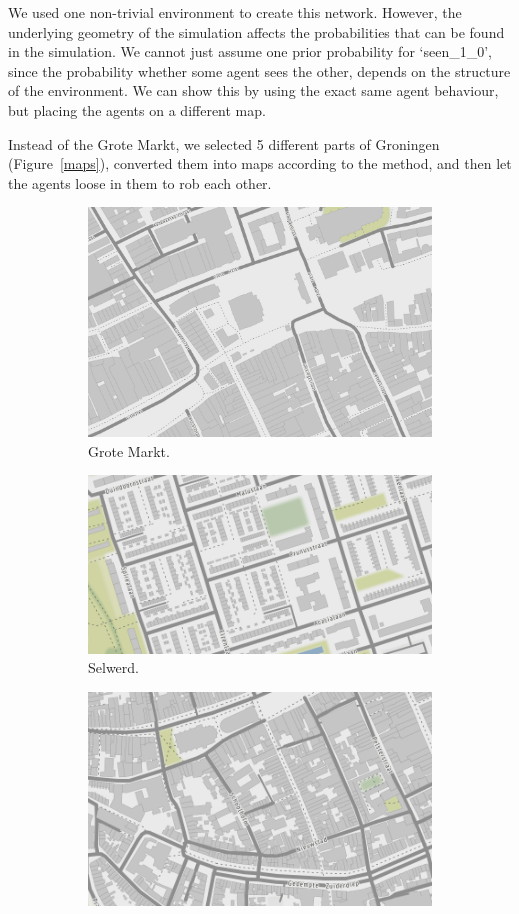 \begin{enumerate}
We used one non-trivial environment to create this network. However, the underlying geometry of the simulation affects the probabilities that can be found in the simulation. We cannot just assume one prior probability for `seen\_1\_0', since the probability whether some agent sees the other, depends on the structure of the environment. We can show this by using the exact same agent behaviour, but placing the agents on a different map.

Instead of the Grote Markt, we selected 5 different parts of Groningen (Figure~\ref{maps}), converted them into maps according to the method, and then let the agents loose in them to rob each other.
\begin{figure}[htbp]
\begin{center}
\begin{subfigure}{.5\textwidth}
\includegraphics[width=0.8\linewidth]{../experiments/GroteMarktMaps/maps/groteMarkt.png}
\caption{Grote Markt.}
\end{subfigure}%
\begin{subfigure}{.5\textwidth}
\includegraphics[width=0.8\linewidth]{../experiments/GroteMarktMaps/maps/Selwerd.png}
\caption{Selwerd.}
\end{subfigure}
\begin{subfigure}{.5\textwidth}
\includegraphics[width=0.8\linewidth]{../experiments/GroteMarktMaps/maps/zuidCentrum.png}

\end{subfigure}
\end{center}
\end{figure}
\end{enumerate}
